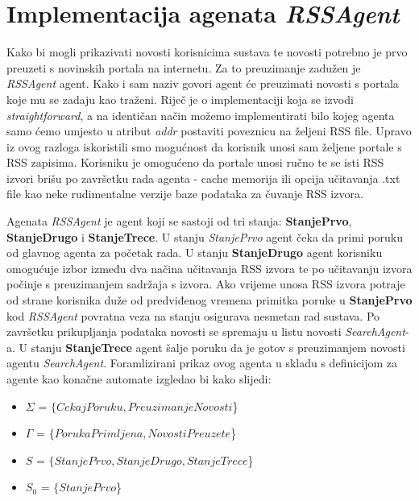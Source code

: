 \documentclass[]{foi} %
\begin{document}
\section{Implementacija agenata \textit{RSSAgent}}
Kako bi mogli prikazivati novosti korisnicima sustava te novosti potrebno je prvo preuzeti s novinskih portala na internetu. Za to preuzimanje zadužen je \textit{RSSAgent} agent. Kako i sam naziv govori agent će preuzimati novosti s portala koje mu se zadaju kao traženi. Riječ je o implementaciji koja se izvodi \textit{straightforward}, a na identičan način možemo implementirati bilo kojeg agenta samo ćemo umjesto u atribut \textit{addr} postaviti poveznicu na željeni RSS file. Upravo iz ovog razloga iskoristili smo mogućnost da korisnik unosi sam željene portale s RSS zapisima. Korisniku je omogućeno da portale unosi ručno te se isti RSS izvori brišu po završetku rada agenta - cache memorija ili opcija učitavanja .txt file kao neke rudimentalne verzije baze podataka za čuvanje RSS izvora. 

Agenata \textit{RSSAgent} je agent koji se sastoji od tri stanja: \textbf{StanjePrvo}, \textbf{StanjeDrugo} i \textbf{StanjeTrece}. U stanju \textit{StanjePrvo} agent čeka da primi poruku od glavnog agenta za početak rada. U stanju \textbf{StanjeDrugo} agent korisniku omogućuje izbor između dva načina učitavanja RSS izvora te po učitavanju izvora počinje s preuzimanjem sadržaja s izvora. Ako vrijeme unosa RSS izvora potraje od strane korisnika duže od predviđenog vremena primitka poruke u \textbf{StanjePrvo} kod \textit{RSSAgent} povratna veza na stanju osigurava nesmetan rad sustava. Po završetku prikupljanja podataka novosti se spremaju u listu novosti \textit{SearchAgent}-a. U stanju \textbf{StanjeTrece} agent šalje poruku da je gotov s preuzimanjem novosti agentu \textit{SearchAgent}.
Foramlizirani prikaz ovog agenta u skladu s definicijom za agente kao konačne automate izgledao bi kako slijedi:

\begin{itemize}
  \item \(\Sigma\) = $\{CekajPoruku, PreuzimanjeNovosti$\}
  \item \(\Gamma\) = $\{PorukaPrimljena, NovostiPreuzete$\}
  \item \(S\) = $\{StanjePrvo, StanjeDrugo, StanjeTrece$\}
  \item \(S_0\) = $\{StanjePrvo$\}
\end{itemize}
\end{document}
